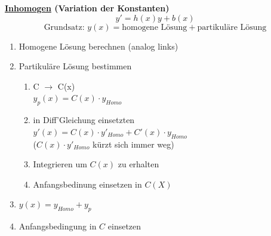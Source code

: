 \documentclass[6pt]{article}
\begin{document}
\begin{multicols*}{3}
\begin{enumerate}[label=(\roman*), itemsep=2pt, parsep=3pt ]
	\end{enumerate}

	
	\columnbreak
	{\bf \underline{Inhomogen} (Variation der Konstanten)} \\
		\vspace{-2mm}
		\[ y' = h(x)y + b(x) \]
		\[ \text{Grundsatz: } y(x) = \text{homogene L{\"o}sung} + \text{partikul{\"a}re L{\"o}sung} \]
	
	\vspace{-5mm}
	\begin{enumerate}[label=(\roman*), itemsep=2pt, parsep=3pt ]
		\item Homogene L{\"o}sung berechnen (analog links)
		\item Partikul{\"a}re L{\"o}sung bestimmen 
			\vspace{-2mm}
			\begin{enumerate}[itemsep=1pt, parsep=2pt]
				\item 	C $\rightarrow$ C(x) \vspace{0mm}\\
							$y_p(x) = C(x) \cdot  y_{Homo}$
				\item 	in Diff'Gleichung einsetzten \vspace{1mm}\\
							$y'(x) = C(x) \cdot  y'_{Homo} + C'(x) \cdot  y_{Homo}$ \vspace{1mm}\\
							($C(x) \cdot  y'_{Homo}$ k{\"u}rzt sich immer weg)
				\item Integrieren um $C(x)$ zu erhalten
				\item Anfangsbedinung einsetzen in $C(X)$		
			\end{enumerate}
			\vspace{-2mm}
		\item $y(x) = y_{Homo} + y_p$
		\item Anfangsbedingung in $C$ einsetzen
	\end{enumerate}
	

\end{multicols*}
\end{document}
